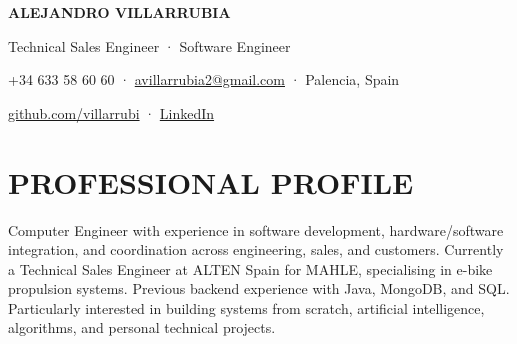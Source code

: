 \documentclass[10pt,a4paper]{article}
\begin{document}
{\fontsize{23}{26}\selectfont\bfseries\color{navy} ALEJANDRO VILLARRUBIA}\par
{\large Technical Sales Engineer · Software Engineer}\par
{\small\color{muted}+34 633 58 60 60 · \href{mailto:avillarrubia2@gmail.com}{avillarrubia2@gmail.com} · Palencia, Spain}\par
{\small\href{https://github.com/villarrubi}{github.com/villarrubi} · \href{https://www.linkedin.com/in/alejandro-villarrubia-garc\%C3\%ADa-3078892b9/}{LinkedIn}}\par
\section*{PROFESSIONAL PROFILE}
Computer Engineer with experience in software development, hardware/software integration, and coordination across engineering, sales, and customers. Currently a Technical Sales Engineer at ALTEN Spain for MAHLE, specialising in e-bike propulsion systems. Previous backend experience with Java, MongoDB, and SQL. Particularly interested in building systems from scratch, artificial intelligence, algorithms, and personal technical projects.
\end{document}
